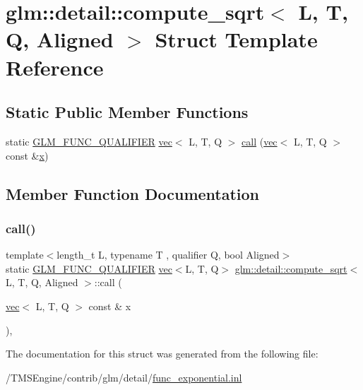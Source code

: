 \hypertarget{structglm_1_1detail_1_1compute__sqrt}{}\section{glm\+:\+:detail\+:\+:compute\+\_\+sqrt$<$ L, T, Q, Aligned $>$ Struct Template Reference}
\label{structglm_1_1detail_1_1compute__sqrt}
\subsection*{Static Public Member Functions}
\begin{DoxyCompactItemize}
\item 
static \hyperlink{setup_8hpp_a33fdea6f91c5f834105f7415e2a64407}{G\+L\+M\+\_\+\+F\+U\+N\+C\+\_\+\+Q\+U\+A\+L\+I\+F\+I\+ER} \hyperlink{structglm_1_1vec}{vec}$<$ L, T, Q $>$ \hyperlink{structglm_1_1detail_1_1compute__sqrt_a356d5e5be126cceb0086242ff6c9d905}{call} (\hyperlink{structglm_1_1vec}{vec}$<$ L, T, Q $>$ const \&\hyperlink{_s_d_l__opengl_8h_ad0e63d0edcdbd3d79554076bf309fd47}{x})
\end{DoxyCompactItemize}


\subsection{Member Function Documentation}
\mbox{\label{structglm_1_1detail_1_1compute__sqrt_a356d5e5be126cceb0086242ff6c9d905}} 
\subsubsection{\texorpdfstring{call()}{call()}}
{\footnotesize\ttfamily template$<$length\+\_\+t L, typename T , qualifier Q, bool Aligned$>$ \\
static \hyperlink{setup_8hpp_a33fdea6f91c5f834105f7415e2a64407}{G\+L\+M\+\_\+\+F\+U\+N\+C\+\_\+\+Q\+U\+A\+L\+I\+F\+I\+ER} \hyperlink{structglm_1_1vec}{vec}$<$L, T, Q$>$ \hyperlink{structglm_1_1detail_1_1compute__sqrt}{glm\+::detail\+::compute\+\_\+sqrt}$<$ L, T, Q, Aligned $>$\+::call (\begin{DoxyParamCaption}\item[{\hyperlink{structglm_1_1vec}{vec}$<$ L, T, Q $>$ const \&}]{x }\end{DoxyParamCaption})\hspace{0.3cm}{\ttfamily [inline]}, {\ttfamily [static]}}



The documentation for this struct was generated from the following file\+:\begin{DoxyCompactItemize}
\item 
/\+T\+M\+S\+Engine/contrib/glm/detail/\hyperlink{func__exponential_8inl}{func\+\_\+exponential.\+inl}\end{DoxyCompactItemize}
